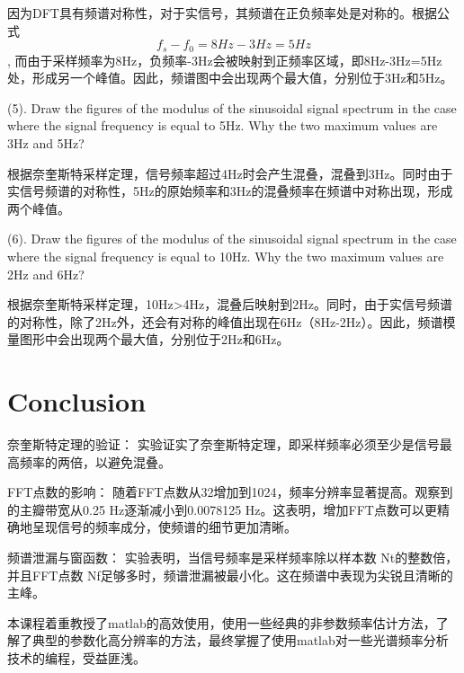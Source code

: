 \documentclass{article}
\begin{document}
因为DFT具有频谱对称性，对于实信号，其频谱在正负频率处是对称的。根据公式
\begin{equation}
f_s - f_0 = 8Hz - 3Hz = 5Hz
\end{equation}
, 而由于采样频率为8Hz，负频率-3Hz会被映射到正频率区域，即8Hz-3Hz=5Hz处，形成另一个峰值。因此，频谱图中会出现两个最大值，分别位于3Hz和5Hz。
\vspace{3em}

(5). Draw the figures of the modulus of the sinusoidal signal spectrum in the case where the signal frequency is equal to 5Hz. Why the two maximum values are 3Hz and 5Hz?
\vspace{1em}

根据奈奎斯特采样定理，信号频率超过4Hz时会产生混叠，混叠到3Hz。同时由于实信号频谱的对称性，5Hz的原始频率和3Hz的混叠频率在频谱中对称出现，形成两个峰值。
\vspace{3em}

(6). Draw the figures of the modulus of the sinusoidal signal spectrum in the case where the signal frequency is equal to 10Hz. Why the two maximum values are 2Hz and 6Hz?\vspace{1em}

根据奈奎斯特采样定理，10Hz>4Hz，混叠后映射到2Hz。同时，由于实信号频谱的对称性，除了2Hz外，还会有对称的峰值出现在6Hz（8Hz-2Hz）。因此，频谱模量图形中会出现两个最大值，分别位于2Hz和6Hz。\vspace{3em}


\section{Conclusion}
奈奎斯特定理的验证：
实验证实了奈奎斯特定理，即采样频率必须至少是信号最高频率的两倍，以避免混叠。


FFT点数的影响：
随着FFT点数从32增加到1024，频率分辨率显著提高。观察到的主瓣带宽从0.25 Hz逐渐减小到0.0078125 Hz。这表明，增加FFT点数可以更精确地呈现信号的频率成分，使频谱的细节更加清晰。


频谱泄漏与窗函数：
实验表明，当信号频率是采样频率除以样本数 Nt的整数倍，并且FFT点数 Nf足够多时，频谱泄漏被最小化。这在频谱中表现为尖锐且清晰的主峰。

本课程着重教授了matlab的高效使用，使用一些经典的非参数频率估计方法，了解了典型的参数化高分辨率的方法，最终掌握了使用matlab对一些光谱频率分析技术的编程，受益匪浅。
\end{document}
